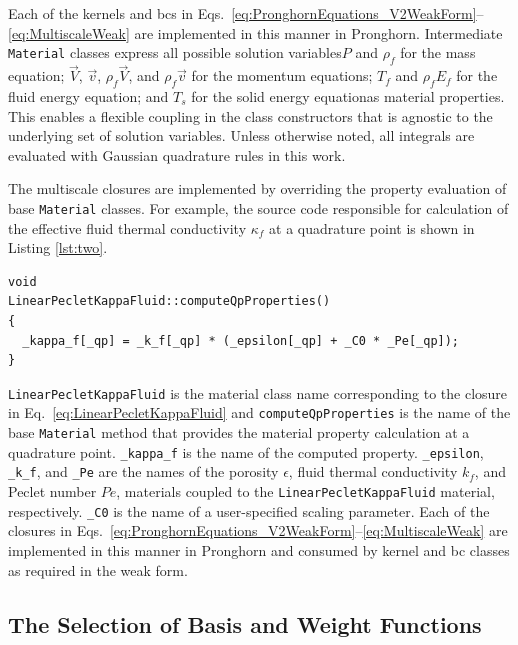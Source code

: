 Each of the kernels and \glspl{bc} in Eqs.\ \eqref{eq:PronghornEquations_V2WeakForm}--\eqref{eq:MultiscaleWeak} are implemented in this manner in Pronghorn. Intermediate \texttt{Material} classes express all possible solution variables\mdash \(P\) and \(\rho_f\) for the mass equation; \(\vec{V}\), \(\vec{v}\), \(\rho_f\vec{V}\), and \(\rho_f\vec{v}\) for the momentum equations; \(T_f\) and \(\rho_fE_f\) for the fluid energy equation; and \(T_s\) for the solid energy equation\mdash as material properties. This enables a flexible coupling in the class constructors that is agnostic to the underlying set of solution variables. Unless otherwise noted, all integrals are evaluated with Gaussian quadrature rules in this work.

The multiscale closures are implemented by overriding the property evaluation of base \texttt{Material} classes. For example, the source code responsible for calculation of the effective fluid thermal conductivity \(\kappa_f\) at a quadrature point is shown in Listing \ref{lst:two}.

\vspace{1em}
\begin{minipage}[c]{0.92\linewidth}
\begin{lstlisting}[caption={Pronghorn source code evaluation of \(\kappa_f\) by Eq.\ \eqref{eq:LinearPecletKappaFluid}.}, captionpos=b,label={lst:two}]
void
LinearPecletKappaFluid::computeQpProperties()
{
  _kappa_f[_qp] = _k_f[_qp] * (_epsilon[_qp] + _C0 * _Pe[_qp]);
}
\end{lstlisting}
\end{minipage}

\texttt{LinearPecletKappaFluid} is the material class name corresponding to the closure in Eq.\ \eqref{eq:LinearPecletKappaFluid} and \texttt{computeQpProperties} is the name of the base \texttt{Material} method that provides the material property calculation at a quadrature point. \texttt{\_kappa\_f} is the name of the computed property. \texttt{\_epsilon}, \texttt{\_k\_f}, and \texttt{\_Pe} are the names of the porosity \(\epsilon\), fluid thermal conductivity \(k_f\), and Peclet number \(Pe\), materials coupled to the \texttt{LinearPecletKappaFluid} material, respectively. \texttt{\_C0} is the name of a user-specified scaling parameter. Each of the closures in Eqs.\ \eqref{eq:PronghornEquations_V2WeakForm}--\eqref{eq:MultiscaleWeak} are implemented in this manner in Pronghorn and consumed by kernel and \gls{bc} classes as required in the weak form.

\subsection{The Selection of Basis and Weight Functions}
\label{sec:basis}

